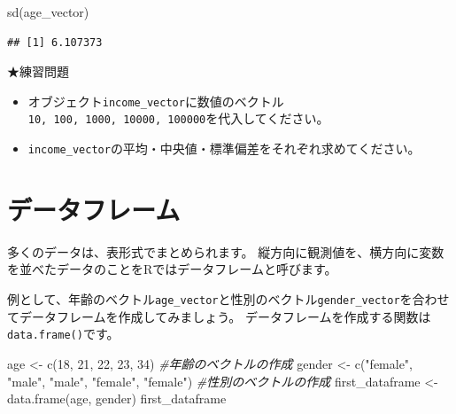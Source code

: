 \documentclass[
]{book}
\newenvironment{Shaded}{\begin{snugshade}}{\end{snugshade}}
\newcommand{\CommentTok}[1]{\textcolor[rgb]{0.56,0.35,0.01}{\textit{#1}}}
\newcommand{\DecValTok}[1]{\textcolor[rgb]{0.00,0.00,0.81}{#1}}
\newcommand{\FunctionTok}[1]{\textcolor[rgb]{0.00,0.00,0.00}{#1}}
\newcommand{\NormalTok}[1]{#1}
\newcommand{\OtherTok}[1]{\textcolor[rgb]{0.56,0.35,0.01}{#1}}
\newcommand{\StringTok}[1]{\textcolor[rgb]{0.31,0.60,0.02}{#1}}
\providecommand{\tightlist}{%
  \setlength{\itemsep}{0pt}\setlength{\parskip}{0pt}}
\begin{document}
\begin{Shaded}
\begin{Highlighting}[]
\FunctionTok{sd}\NormalTok{(age\_vector)}
\end{Highlighting}
\end{Shaded}

\begin{verbatim}
## [1] 6.107373
\end{verbatim}

★練習問題

\begin{itemize}
\tightlist
\item
  オブジェクト\texttt{income\_vector}に数値のベクトル\texttt{10,\ 100,\ 1000,\ 10000,\ 100000}を代入してください。
\item
  \texttt{income\_vector}の平均・中央値・標準偏差をそれぞれ求めてください。
\end{itemize}

\hypertarget{ux30c7ux30fcux30bfux30d5ux30ecux30fcux30e0}{%
\section{データフレーム}\label{ux30c7ux30fcux30bfux30d5ux30ecux30fcux30e0}}

多くのデータは、表形式でまとめられます。
縦方向に観測値を、横方向に変数を並べたデータのことをRではデータフレームと呼びます。

例として、年齢のベクトル\texttt{age\_vector}と性別のベクトル\texttt{gender\_vector}を合わせてデータフレームを作成してみましょう。
データフレームを作成する関数は\texttt{data.frame()}です。

\begin{Shaded}
\begin{Highlighting}[]
\NormalTok{age }\OtherTok{\textless{}{-}} \FunctionTok{c}\NormalTok{(}\DecValTok{18}\NormalTok{, }\DecValTok{21}\NormalTok{, }\DecValTok{22}\NormalTok{, }\DecValTok{23}\NormalTok{, }\DecValTok{34}\NormalTok{) }\CommentTok{\#年齢のベクトルの作成}
\NormalTok{gender }\OtherTok{\textless{}{-}} \FunctionTok{c}\NormalTok{(}\StringTok{"female"}\NormalTok{, }\StringTok{"male"}\NormalTok{, }\StringTok{"male"}\NormalTok{, }\StringTok{"female"}\NormalTok{, }\StringTok{"female"}\NormalTok{) }\CommentTok{\#性別のベクトルの作成}
\NormalTok{first\_dataframe }\OtherTok{\textless{}{-}} \FunctionTok{data.frame}\NormalTok{(age, gender)}
\NormalTok{first\_dataframe}
\end{Highlighting}
\end{Shaded}
\end{document}
